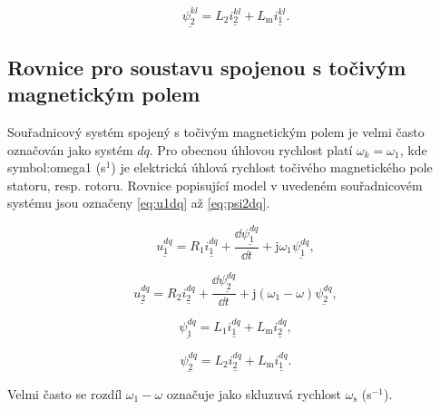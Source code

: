 \documentclass[a4paper, twoside, 11pt]{article}
\begin{document}
    \begin{equation}\label{eq:psi2kl}
        \underline{\psi_2^{kl}} = L_2 \underline{i_2^{kl}} + L_\text{m} \underline{i_1^{kl}}.
    \end{equation}

    \subsection{Rovnice pro soustavu spojenou s točivým magnetickým polem}
    Souřadnicový systém spojený s točivým magnetickým polem je velmi často označován jako systém $dq$. Pro obecnou úhlovou rychlost platí $\omega_k = \omega_1$, kde \gls{symbol:omega1} (s$^{1}$) je elektrická úhlová rychlost točivého magnetického pole statoru, resp. rotoru.  Rovnice popisující model v uvedeném souřadnicovém systému jsou označeny \ref{eq:u1dq} až \ref{eq:psi2dq}.\par

 \begin{equation}\label{eq:u1dq}
     \underline{u_{1}^{dq}} = R_1 \underline{i_1^{dq}} + \frac{\dd{\underline{\psi_1^{dq}}}}{\dd{t}} + \text{j} \omega_1 \underline{\psi_1^{dq}},
    \end{equation}

    \begin{equation}
        \underline{u_{2}^{dq}} = R_2 \underline{i_2^{dq}} + \frac{\dd{\underline{\psi_2^{dq}}}}{\dd{t}} + \text{j} (\omega_1 - \omega) \underline{\psi_2^{dq}},
    \end{equation}

    \begin{equation}
        \underline{\psi_1^{dq}} = L_1 \underline{i_1^{dq}} + L_\text{m} \underline{i_2^{dq}},
    \end{equation}

    \begin{equation}\label{eq:psi2dq}
        \underline{\psi_2^{dq}} = L_2 \underline{i_2^{dq}} + L_\text{m} \underline{i_1^{dq}}.
    \end{equation}

    Velmi často se rozdíl $\omega_1 - \omega$ označuje jako skluzuvá rychlost $\omega_\text{s}$ (s$^{-1}$).
\end{document}
